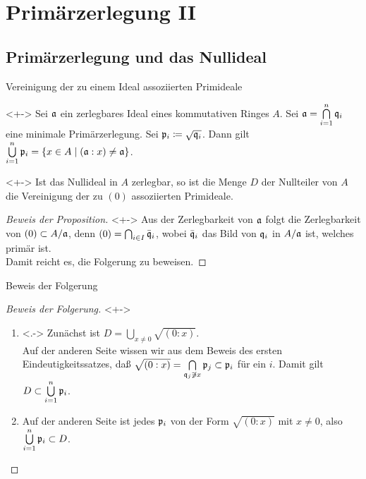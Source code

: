 \section{Primärzerlegung II}

\subsection{Primärzerlegung und das Nullideal} 

\begin{frame}{Vereinigung der zu einem Ideal assoziierten Primideale}
	 \begin{proposition}<+->
	 	\label{prop:union_of_assoc_primes}
		Sei \(\mathfrak{a}\) ein zerlegbares Ideal eines kommutativen Ringes \(A\). Sei \(\mathfrak{a} = \bigcap\limits_{i = 1}^n
		\mathfrak{q}_i\) eine minimale Primärzerlegung. Sei \(\mathfrak{p}_i \coloneqq \sqrt{\mathfrak{q}_i}\). Dann gilt
		\(\bigcup\limits_{i = 1}^n \mathfrak{p}_i = \{x \in A \mid (\mathfrak{a} : x) \neq \mathfrak{a}\}\).
	\end{proposition}
	\begin{corollary}<+->
		Ist das Nullideal in \(A\) zerlegbar, so ist die Menge \(D\) der Nullteiler von \(A\) die Vereinigung der zu \((0)\)
		assoziierten Primideale.
	\end{corollary}
	\begin{proof}[Beweis der Proposition]<+->
		Aus der Zerlegbarkeit von \(\mathfrak{a}\) folgt die Zerlegbarkeit von \((0) \subset A/\mathfrak{a}\), denn \((0) = \bigcap_{i \in I}
		\bar{\mathfrak{q}}_i\), wobei \(\bar{\mathfrak{q}}_i\) das Bild von \(\mathfrak{q}_i\) in \(A/\mathfrak{a}\) ist, welches primär ist.
		\\
		Damit reicht es, die Folgerung zu beweisen.
	\end{proof}
\end{frame}

\begin{frame}{Beweis der Folgerung}
	\begin{proof}[Beweis der Folgerung]<+->
		\begin{enumerate}[<+->]
		\item<.->
			Zunächst ist \(D = \bigcup\limits_{x \neq 0} \sqrt{(0 : x)}\).
			\\
			Auf der anderen Seite wissen wir aus dem Beweis des ersten Eindeutigkeitssatzes, daß
			\(\sqrt{(0 : x)} = \bigcap\limits_{\mathfrak{q}_j \not\ni x} \mathfrak{p}_j \subset \mathfrak{p}_i\) für ein \(i\). Damit
			gilt \(D \subset \bigcup\limits_{i = 1}^n \mathfrak{p}_i\).
		\item
			Auf der anderen Seite ist jedes \(\mathfrak{p}_i\) von der Form \(\sqrt{(0 : x)}\) mit \(x \neq 0\), also
			\(\bigcup\limits_{i = 1}^n \mathfrak{p}_i \subset D\).
			\qedhere
		\end{enumerate}
	\end{proof}
\end{frame}

